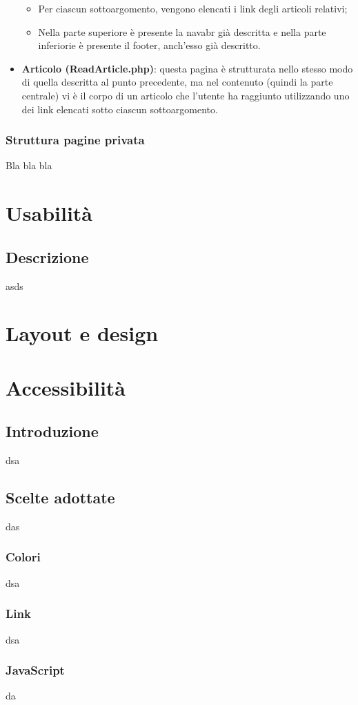 \documentclass[12pt]{article}
\begin{document}
\begin{itemize}
\begin{itemize}
					\item Per ciascun sottoargomento, vengono elencati i link degli articoli relativi;
					\item Nella parte superiore è presente la navabr già descritta e nella parte inferiorie è presente il footer, anch'esso già descritto.
				\end{itemize}
			\item \textbf{Articolo (ReadArticle.php)}:  questa pagina è strutturata nello stesso modo di quella descritta al punto precedente, ma nel contenuto (quindi la parte centrale) vi è il corpo di un articolo che l'utente ha raggiunto utilizzando uno dei link elencati sotto ciascun sottoargomento.
		\end{itemize}
	\subsubsection{Struttura pagine privata}
	Bla bla bla

	\section{Usabilità}
	\label{Usabilità}
	\subsection{Descrizione}
	asds
	\section{Layout e design}

	\section{Accessibilità}
	\subsection{Introduzione}
	dsa
	\subsection{Scelte adottate}
	das
	\subsubsection{Colori}
	dsa
	\subsubsection{Link}
	dsa
	\subsubsection{JavaScript}
	da
\end{document}
